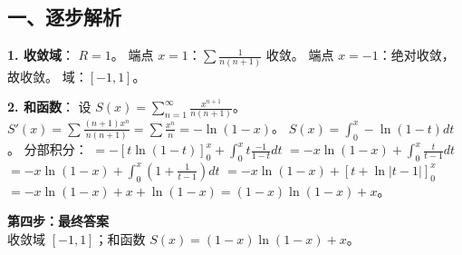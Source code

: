 \documentclass[12pt, a4paper]{ctexart}
\newenvironment{RedAnalysis}{
    \par
    \color{red} %
}{
    \par
    \color{black} %
}
\begin{document}
\begin{RedAnalysis}

\subsection*{一、逐步解析}

\textbf{1. 收敛域}：
$R = 1$。
端点 $x=1$：$\sum \frac{1}{n(n+1)}$ 收敛。
端点 $x=-1$：绝对收敛，故收敛。
域：$[-1, 1]$。

\textbf{2. 和函数}：
设 $S(x) = \sum_{n=1}^\infty \frac{x^{n+1}}{n(n+1)}$。
$S'(x) = \sum \frac{(n+1)x^n}{n(n+1)} = \sum \frac{x^n}{n} = -\ln(1-x)$。
$S(x) = \int_0^x -\ln(1-t) dt$。
分部积分：
$= -[t \ln(1-t)]_0^x + \int_0^x t \frac{-1}{1-t} dt$
$= -x \ln(1-x) + \int_0^x \frac{t}{t-1} dt$
$= -x \ln(1-x) + \int_0^x (1 + \frac{1}{t-1}) dt$
$= -x \ln(1-x) + [t + \ln|t-1|]_0^x$
$= -x \ln(1-x) + x + \ln(1-x) = (1-x)\ln(1-x) + x$。

\textbf{第四步：最终答案} \\
收敛域 $[-1, 1]$；和函数 $ S(x) = (1-x)\ln(1-x) + x $。

\end{RedAnalysis}
\end{document}
